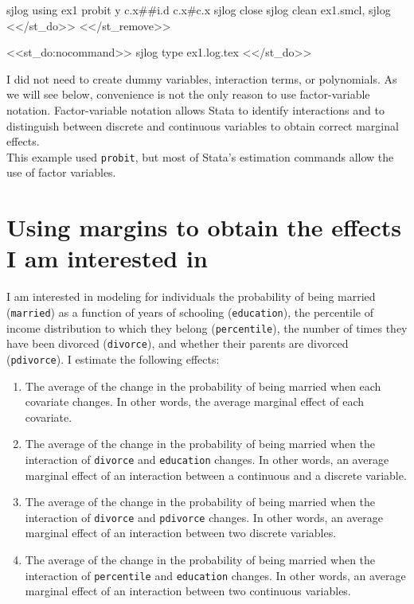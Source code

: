 \documentclass[11pt]{article}
\begin{document}
sjlog using ex1
probit y  c.x##i.d c.x#c.x
sjlog close
sjlog clean ex1.smcl, sjlog 
<</st_do>>
<</st_remove>>

\begin{stlog}[auto]
<<st_do:nocommand>>
sjlog type ex1.log.tex
<</st_do>>
\end{stlog}

I did not need to create dummy variables, interaction terms, or polynomials. As we will see below, convenience is not the only reason to use factor-variable notation. Factor-variable notation allows Stata to identify interactions and to distinguish between discrete and continuous variables to obtain correct marginal effects. \\

This example used \texttt{probit}, but most of Stata's estimation commands allow the use of factor variables.  

\section*{Using margins to obtain the effects I am interested in}

I am interested in modeling for individuals the probability of being married (\texttt{married}) as a function of years of schooling (\texttt{education}), the percentile of income distribution to which they belong (\texttt{percentile}), the number of times they have been divorced (\texttt{divorce}), and whether their parents are divorced (\texttt{pdivorce}). I estimate the following effects:

\begin{enumerate}
\item The average of the change in the probability of being married when each covariate changes. In other words, the average marginal effect of each covariate.
\item The average of the change in the probability of being married when the interaction of \texttt{divorce} and \texttt{education} changes. In other words, an average marginal effect of an interaction between a continuous and a discrete variable. 
\item The average of the change in the probability of being married when the interaction of \texttt{divorce} and \texttt{pdivorce} changes. In other words, an average marginal effect of an interaction between two discrete variables. 
\item The average of the change in the probability of being married when the interaction of \texttt{percentile} and \texttt{education} changes. In other words, an average marginal effect of an interaction between two continuous variables. 
\end{enumerate}
\end{document}
